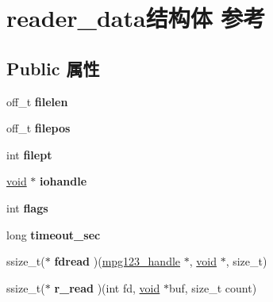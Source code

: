 \hypertarget{structreader__data}{}\section{reader\+\_\+data结构体 参考}
\label{structreader__data}
\subsection*{Public 属性}
\begin{DoxyCompactItemize}
\item 
\mbox{\label{structreader__data_aa408c59357451eb2d493066635c8d91d}} 
off\+\_\+t {\bfseries filelen}
\item 
\mbox{\label{structreader__data_a1e2e258da79cc3dedeb477da7aa16c69}} 
off\+\_\+t {\bfseries filepos}
\item 
\mbox{\label{structreader__data_ab0586464815a2179f20e90014f7e2414}} 
int {\bfseries filept}
\item 
\mbox{\label{structreader__data_ad770d0077df7f04f087bc24be06915d8}} 
\hyperlink{interfacevoid}{void} $\ast$ {\bfseries iohandle}
\item 
\mbox{\label{structreader__data_aa2ce64ec8d85763a690750a2187a2502}} 
int {\bfseries flags}
\item 
\mbox{\label{structreader__data_a9dc6cc0145b8d678f8c9d380a2241688}} 
long {\bfseries timeout\+\_\+sec}
\item 
\mbox{\label{structreader__data_a209d9ad8ed16e253e7565f753f859d7f}} 
ssize\+\_\+t($\ast$ {\bfseries fdread} )(\hyperlink{group__mpg123__init_ga6728e2839a395f3a07d4514da659faca}{mpg123\+\_\+handle} $\ast$, \hyperlink{interfacevoid}{void} $\ast$, size\+\_\+t)
\item 
\mbox{\label{structreader__data_a0bfb3c676c8166f5a45260e32aaa48c7}} 
ssize\+\_\+t($\ast$ {\bfseries r\+\_\+read} )(int fd, \hyperlink{interfacevoid}{void} $\ast$buf, size\+\_\+t count)
\item 
\mbox{\label{structreader__data_ad9aab9447cf22b4b876ffca5f0c45be0}} 

\end{DoxyCompactItemize}
